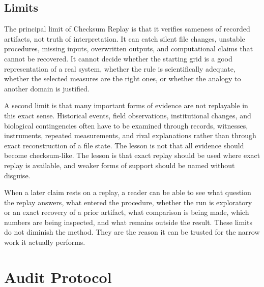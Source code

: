 \documentclass[11pt,a4paper,openany]{book}
\begin{document}
\subsection{Limits}
The principal limit of Checksum Replay is that it verifies sameness of recorded artifacts, not truth of interpretation. It can catch silent file changes, unstable procedures, missing inputs, overwritten outputs, and computational claims that cannot be recovered. It cannot decide whether the starting grid is a good representation of a real system, whether the rule is scientifically adequate, whether the selected measures are the right ones, or whether the analogy to another domain is justified. \cite{nicolis_prigogine_selforg,kauffman_autocatalytic}\par
A second limit is that many important forms of evidence are not replayable in this exact sense. Historical events, field observations, institutional changes, and biological contingencies often have to be examined through records, witnesses, instruments, repeated measurements, and rival explanations rather than through exact reconstruction of a file state. The lesson is not that all evidence should become checksum-like. The lesson is that exact replay should be used where exact replay is available, and weaker forms of support should be named without disguise.\par
When a later claim rests on a replay, a reader can be able to see what question the replay answers, what entered the procedure, whether the run is exploratory or an exact recovery of a prior artifact, what comparison is being made, which numbers are being inspected, and what remains outside the result. These limits do not diminish the method. They are the reason it can be trusted for the narrow work it actually performs.\par
\section{Audit Protocol}
\end{document}
